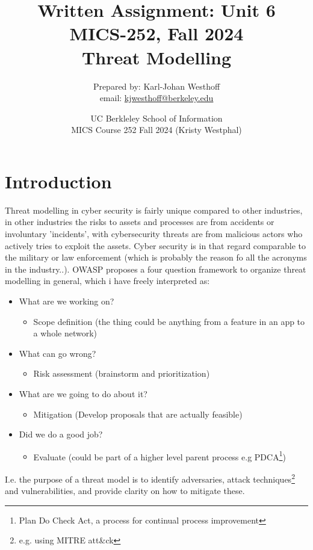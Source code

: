 \documentclass[
	letterpaper, %
	10pt, %
	unnumberedsections, %
	twoside, %
]{APAAssignment}
\title{Written Assignment: Unit 6 \\ MICS-252, Fall 2024 \\ Threat Modelling} %
\date{UC Berkleley School of Information \\
MICS Course 252 Fall 2024 (Kristy Westphal)
}
\author{
	Prepared by: Karl-Johan Westhoff \\
	email: \href{mailto:kjwesthoff@berkeley.edu}{kjwesthoff@berkeley.edu}
}
\begin{document}
\onecolumn
\maketitle %



\section{Introduction}
Threat modelling in cyber security is fairly unique compared to other industries, in other industries the risks to assets and processes are from accidents or involuntary 'incidents', with cybersecurity threats are from malicious actors who actively tries to exploit the assets. Cyber security is in that regard  comparable to the military or law enforcement (which is probably the reason fo all the acronyms in the industry..). OWASP proposes a four question framework\cite{OWASP_ThreatModellingProject} to organize threat modelling in general, which i have freely interpreted as:


\begin{spacing}{1}
\begin{itemize}
	\item What are we working on?
	\begin{itemize}
		\item Scope definition (the thing could be anything from a feature in an app to a whole network)
	\end{itemize}
	\item What can go wrong?
	\begin{itemize}
		\item Risk assessment (brainstorm and prioritization)	
	\end{itemize}
	\item What are we going to do about it?
	\begin{itemize}
		\item Mitigation (Develop proposals that are actually feasible)
	\end{itemize}
	\item Did we do a good job?
	\begin{itemize}
		\item Evaluate (could be part of a higher level parent process e.g PDCA\footnote{Plan Do Check Act, a process for continual process improvement\cite{PDCA_Wiki}})
	\end{itemize}
\end{itemize}
\end{spacing}
I.e. the purpose of a threat model is to identify adversaries, attack techniques\footnote{e.g. using MITRE att\&ck} and vulnerabilities, and provide clarity on how to mitigate these.   
\end{document}
